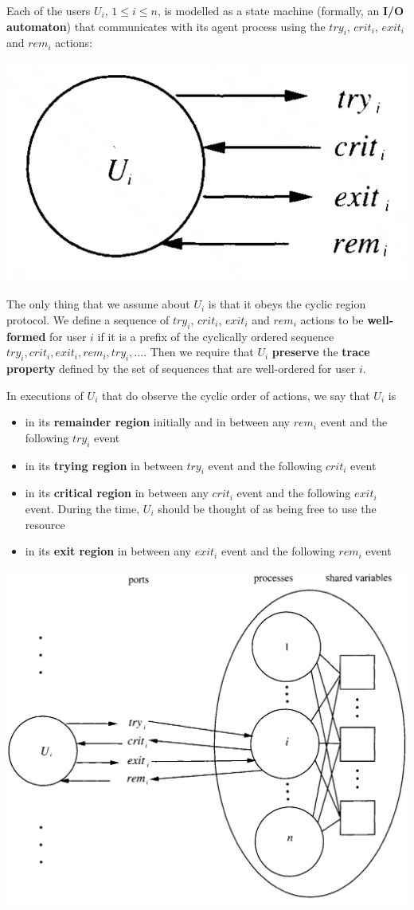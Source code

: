 \documentclass[11pt]{article}
\begin{document}
Each of the users \(U_i\), \(1\le i\le n\), is modelled as a state machine (formally, an \textbf{I/O
automaton}) that communicates with its agent process using the \(try_i\), \(crit_i\), \(exit_i\) and
\(rem_i\) actions:
\begin{center}
\includegraphics[width=.2\textwidth]{../images/DistributedAlgorithms/2.png}
\end{center}
The only thing that we assume about \(U_i\) is that it obeys the cyclic region protocol.
We define a sequence of \(try_i\), \(crit_i\), \(exit_i\) and \(rem_i\) actions to be \textbf{well-formed} for
user \(i\) if it is a prefix of the cyclically ordered sequence
\(try_i,crit_i,exit_i,rem_i,try_i,\dots\). Then we require that \(U_i\) \textbf{preserve} the \textbf{trace property}
defined by the set of sequences that are well-ordered for user \(i\).

In executions of \(U_i\) that do observe the cyclic order of actions, we say that \(U_i\) is
\begin{itemize}
\item in its \textbf{remainder region} initially and in between any \(rem_i\) event and the following \(try_i\) event
\item in its \textbf{trying region} in between \(try_i\) event and the following \(crit_i\) event
\item in its \textbf{critical region} in between any \(crit_i\) event and the following \(exit_i\) event. During
the time, \(U_i\) should be thought of as being free to use the resource
\item in its \textbf{exit region} in between any \(exit_i\) event and the following \(rem_i\) event
\end{itemize}


\begin{center}
\includegraphics[width=.9\textwidth]{../images/DistributedAlgorithms/4.png}
\end{center}
\end{document}
